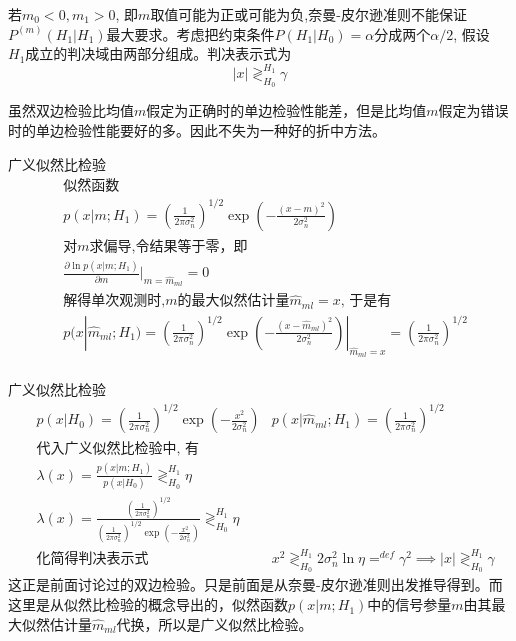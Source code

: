 \begin{frame}
若$m_0<0,m_1>0$, 即$m$取值可能为正或可能为负,奈曼-皮尔逊准则不能保证$P^{(m)}(H_1|H_1)$最大要求。考虑把约束条件$P(H_1|H_0)=\alpha$分成两个$\alpha/2$, 假设$H_1成立$的判决域由两部分组成。判决表示式为
	\[|x|\mathop{\gtrless}_{H_0}^{H_1}\gamma \]

\begin{block}{}
	虽然双边检验比均值$m$假定为正确时的单边检验性能差，但是比均值$m$假定为错误时的单边检验性能要好的多。因此不失为一种好的折中方法。
\end{block}
\end{frame}

\begin{frame}{广义似然比检验}
\begin{align*}
&\text{似然函数}\\
&p(x|m;H_1)=(\frac{1}{2\pi\sigma_n^2})^{1/2}\exp(-\frac{(x-m)^2}{2\sigma_n^2})\\
&\text{对$m$求偏导,令结果等于零，即} \\
&\frac{\partial\ln p(x|m;H_1)}{\partial m}|_{m=\widehat{m}_{ml}}=0\\
&\text{解得单次观测时,$m$的最大似然估计量$\widehat{m}_{ml}=x$, 于是有 }\\
&p(x|\widehat{m}_{ml};H_1)=(\frac{1}{2\pi\sigma_n^2})^{1/2}\exp(-\frac{(x-\widehat{m}_{ml})^2}{2\sigma_n^2})|_{\widehat{m}_{ml}=x}=(\frac{1}{2\pi\sigma_n^2})^{1/2}\\
\end{align*}
\end{frame}
\begin{frame}{广义似然比检验}
\begin{align*}
&p(x|H_0)=(\frac{1}{2\pi\sigma_n^2})^{1/2}\exp(-\frac{x^2}{2\sigma_n^2})
&p(x|\widehat{m}_{ml};H_1)=(\frac{1}{2\pi\sigma_n^2})^{1/2}\\
&\text{代入广义似然比检验中, 有}\\
&\lambda(x)=\frac{p(x|m; H_1)}{p(x|H_0)}\mathop{\gtrless}_{H_0}^{H_1}\eta\\
&\lambda(x)=\frac{(\frac{1}{2\pi\sigma_n^2})^{1/2}}{(\frac{1}{2\pi\sigma_n^2})^{1/2}\exp(-\frac{x^2}{2\sigma_n^2})}\mathop{\gtrless}_{H_0}^{H_1}\eta\\
&\text{化简得判决表示式}
&x^2\mathop{\gtrless}_{H_0}^{H_1}2\sigma_n^2\ln\eta\mathop{=}^{def}\gamma^2 \implies |x|\mathop{\gtrless}_{H_0}^{H_1}\gamma
\end{align*}
这正是前面讨论过的双边检验。只是前面是从奈曼-皮尔逊准则出发推导得到。而这里是从似然比检验的概念导出的，似然函数$p(x|m;H_1)$中的信号参量$m$由其最大似然估计量$\widehat{m}_{ml}$代换，所以是广义似然比检验。
\end{frame}


